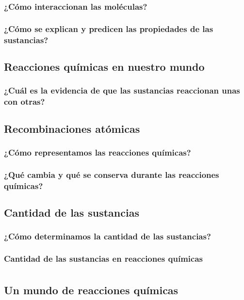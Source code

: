 \documentclass[11pt]{book}
\begin{document}
\subsection{¿Cómo interaccionan las moléculas?}
\subsection{¿Cómo se explican y predicen las propiedades de las sustancias?}

\section{Reacciones químicas en nuestro mundo}
\subsection{¿Cuál es la evidencia de que las sustancias reaccionan unas con otras?}

\section{Recombinaciones atómicas}
\subsection{¿Cómo representamos las reacciones químicas?}
\subsection{¿Qué cambia y qué se conserva durante las reacciones químicas?}

\section{Cantidad de las sustancias}
\subsection{¿Cómo determinamos la cantidad de las sustancias?}
\subsection{Cantidad de las sustancias en reacciones químicas}


\chapter{}

\section{Un mundo de reacciones químicas}
\end{document}
